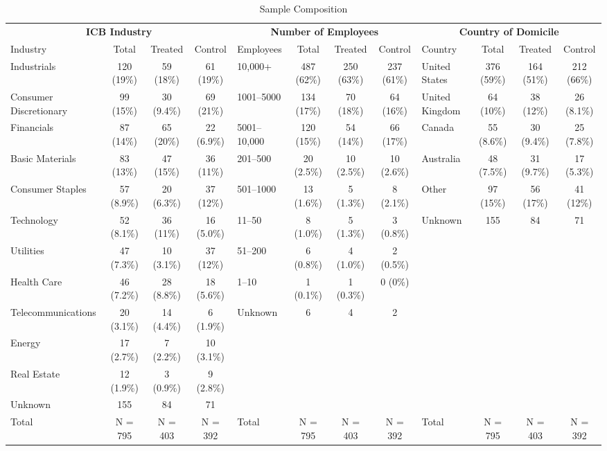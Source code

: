 \documentclass[12pt]{article}
\begin{document}

\begin{sidewaystable}
\caption{Sample Composition}
\footnotesize{} %
\setlength{\tabcolsep}{3pt} %
\begin{tabular}{lccc|lccc|lccc}
    \toprule
    \multicolumn{4}{c|}{\textbf{ICB Industry}} & \multicolumn{4}{c|}{\textbf{Number of Employees}} & \multicolumn{4}{c}{\textbf{Country of Domicile}} \\
    \cmidrule(lr){1-4} \cmidrule(lr){5-8} \cmidrule(lr){9-12}
    Industry & Total & Treated & Control & Employees & Total & Treated & Control & Country & Total & Treated & Control \\
    \midrule
    Industrials & 120 (19\%) & 59 (18\%) & 61 (19\%) & 10,000+ & 487 (62\%) & 250 (63\%) & 237 (61\%) & United States & 376 (59\%) & 164 (51\%) & 212 (66\%) \\
    Consumer Discretionary & 99 (15\%) & 30 (9.4\%) & 69 (21\%) & 1001--5000 & 134 (17\%) & 70 (18\%) & 64 (16\%) & United Kingdom & 64 (10\%) & 38 (12\%) & 26 (8.1\%) \\
    Financials & 87 (14\%) & 65 (20\%) & 22 (6.9\%) & 5001--10,000 & 120 (15\%) & 54 (14\%) & 66 (17\%) & Canada & 55 (8.6\%) & 30 (9.4\%) & 25 (7.8\%) \\
    Basic Materials & 83 (13\%) & 47 (15\%) & 36 (11\%) & 201--500 & 20 (2.5\%) & 10 (2.5\%) & 10 (2.6\%) & Australia & 48 (7.5\%) & 31 (9.7\%) & 17 (5.3\%) \\
    Consumer Staples & 57 (8.9\%) & 20 (6.3\%) & 37 (12\%) & 501--1000 & 13 (1.6\%) & 5 (1.3\%) & 8 (2.1\%) & Other & 97 (15\%) & 56 (17\%) & 41 (12\%) \\
    Technology & 52 (8.1\%) & 36 (11\%) & 16 (5.0\%) & 11--50 & 8 (1.0\%) & 5 (1.3\%) & 3 (0.8\%) & Unknown & 155 & 84 & 71 \\
    Utilities & 47 (7.3\%) & 10 (3.1\%) & 37 (12\%) & 51--200 & 6 (0.8\%) & 4 (1.0\%) & 2 (0.5\%) & & & & \\
    Health Care & 46 (7.2\%) & 28 (8.8\%) & 18 (5.6\%) & 1--10 & 1 (0.1\%) & 1 (0.3\%) & 0 (0\%) & & & & \\
    Telecommunications & 20 (3.1\%) & 14 (4.4\%) & 6 (1.9\%) & Unknown & 6 & 4 & 2 & & & & \\
    Energy & 17 (2.7\%) & 7 (2.2\%) & 10 (3.1\%) & & & & & & & & \\
    Real Estate & 12 (1.9\%) & 3 (0.9\%) & 9 (2.8\%) & & & & & & & & \\
    Unknown & 155 & 84 & 71 & & & & & & & & \\
    \midrule
    Total & N = 795 & N = 403 & N = 392 & Total & N = 795 & N = 403 & N = 392 & Total & N = 795 & N = 403 & N = 392 \\
    \bottomrule
\end{tabular}\label{tab:sample_composition}
\end{sidewaystable}
\end{document}
